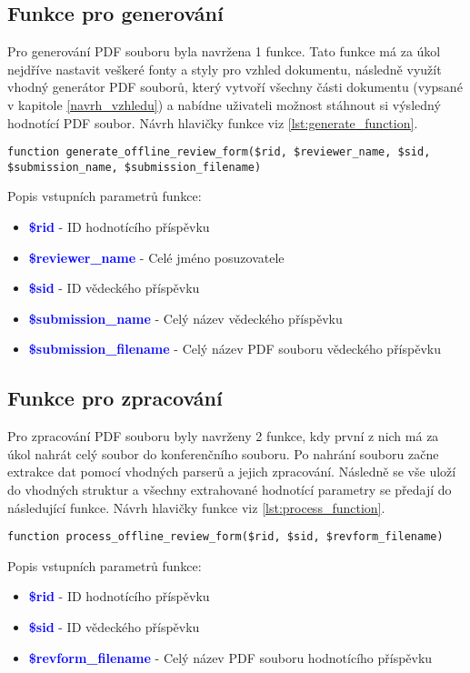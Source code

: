 \subsection{Funkce pro generování}
Pro generování PDF souboru byla navržena 1 funkce. Tato funkce má za úkol nejdříve nastavit veškeré fonty a styly pro vzhled dokumentu, následně využít vhodný generátor PDF souborů, který vytvoří všechny části dokumentu (vypsané v kapitole \ref{navrh_vzhledu}) a nabídne uživateli možnost stáhnout si výsledný hodnotící PDF soubor. Návrh hlavičky funkce viz \ref{lst:generate_function}.

\lstset{style=phpstyle}
\begin{lstlisting}[caption = {Návrh hlavičky funkce pro generování PDF souboru}, label = {lst:generate_function}, captionpos=b]
function generate_offline_review_form($rid, $reviewer_name, $sid, $submission_name, $submission_filename)
\end{lstlisting}
Popis vstupních parametrů funkce:
\begin{itemize}
	\item\textcolor{blue}{\textbf{\$rid}} - ID hodnotícího příspěvku
	\item\textcolor{blue}{\textbf{\$reviewer\_name}} - Celé jméno posuzovatele
	\item\textcolor{blue}{\textbf{\$sid}} - ID vědeckého příspěvku
	\item\textcolor{blue}{\textbf{\$submission\_name}} - Celý název vědeckého příspěvku
	\item\textcolor{blue}{\textbf{\$submission\_filename}} - Celý název PDF souboru vědeckého příspěvku
\end{itemize}

\subsection{Funkce pro zpracování}
Pro zpracování  PDF souboru byly navrženy 2 funkce, kdy první z nich má za úkol nahrát celý soubor do konferenčního souboru. Po nahrání souboru začne extrakce dat pomocí vhodných parserů a jejich zpracování. Následně se vše uloží do vhodných struktur a všechny extrahované hodnotící parametry se předají do následující funkce. Návrh hlavičky funkce viz \ref{lst:process_function}.

\begin{lstlisting}[caption = {Návrh hlavičky funkce pro extrakci dat}, label = {lst:process_function}, captionpos=b]
function process_offline_review_form($rid, $sid, $revform_filename)
\end{lstlisting}
Popis vstupních parametrů funkce:
\begin{itemize}
	\item\textcolor{blue}{\textbf{\$rid}} - ID hodnotícího příspěvku
	\item\textcolor{blue}{\textbf{\$sid}} - ID vědeckého příspěvku
	\item\textcolor{blue}{\textbf{\$revform\_filename}} - Celý název PDF souboru hodnotícího příspěvku
\end{itemize}

